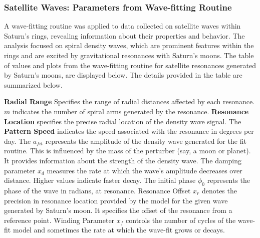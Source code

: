 \documentclass{article}
\begin{document}
\begin{table}
\centering
{}
\caption{Predicted data for spiral density waves excited by Saturn's Satellite resonances.}
\end{table}

\subsubsection{Satellite Waves: Parameters from Wave-fitting Routine}
A wave-fitting routine was applied to data collected on satellite waves within Saturn's rings, revealing information about their properties and behavior. The analysis focused on spiral density waves, which are prominent features within the rings and are excited by gravitational resonances with Saturn's moons. The table of values and plots from the wave-fitting routine for satellite resonances generated by Saturn's moons, are displayed below. The details provided in the table are summarized below.

\textbf{Radial Range} Specifies the range of radial distances affected by each resonance. \textbf{$m$} indicates the number of spiral arms generated by the resonance. \textbf{Resonance Location} specifies the precise radial location of the density wave signal. The \textbf{Pattern Speed} indicates the speed associated with the resonance in degrees per day. The \textbf{$a_{fit}$} represents the amplitude of the density wave generated for the fit routine. This is influenced by the mass of the perturber (say, a moon or planet). It provides information about the strength of the density wave. The damping parameter \textbf{$x_{d}$} measures the rate at which the wave's amplitude decreases over distance. Higher values indicate faster decay. The initial phase \textbf{$\phi_{0}$} represents the phase of the wave in radians, at resonance. Resonance Offset \textbf{$x_{r}$} denotes the precision in resonance location provided by the model for the given wave generated by Saturn's moon. It specifies the offset of the resonance from a reference point. Winding Parameter \textbf{$x_{f}$} controls the number of cycles of the wave-fit model and sometimes the rate at which the wave-fit grows or decays.
\end{document}
